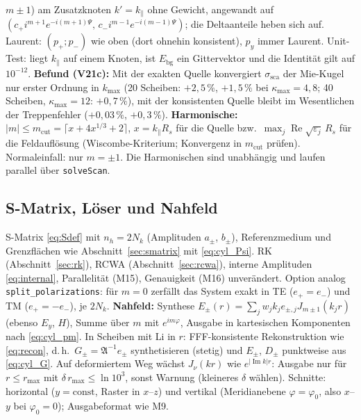 $m\pm1$) am Zusatzknoten $k'=k_\parallel$ ohne Gewicht, angewandt auf $(c_+i^{m+1}e^{-i(m+1)\Psi},\,c_-i^{m-1}e^{-i(m-1)\Psi})$;
die Deltaanteile heben sich auf. Laurent: $(p_+;p_-)$ wie oben (dort ohnehin konsistent), $p_y$ immer Laurent.
Unit-Test: liegt $k_\parallel$ auf einem Knoten, ist $E_{\text{bg}}$ ein Gittervektor und die Identität gilt auf $10^{-12}$.
\textbf{Befund (V21c):} Mit der exakten Quelle konvergiert $\sigma_{\text{sca}}$ der Mie-Kugel nur erster Ordnung in
$k_{\max}$ (20 Scheiben: $+2{,}5\,\%$, $+1{,}5\,\%$ bei $\kappa_{\max}=4,8$; 40 Scheiben, $\kappa_{\max}=12$: $+0{,}7\,\%$), mit der
konsistenten Quelle bleibt im Wesentlichen der Treppenfehler ($+0{,}03\,\%$, $+0{,}3\,\%$).
\textbf{Harmonische:} $|m|\le m_{\text{cut}}=\lceil x+4x^{1/3}+2\rceil$, $x=k_\parallel R_s$ für die Quelle bzw.\
$\max_j\operatorname{Re}\sqrt{\varepsilon_j}\,R_s$ für die Feldauflösung (Wiscombe-Kriterium; Konvergenz in $m_{\text{cut}}$
prüfen). Normaleinfall: nur $m=\pm1$. Die Harmonischen sind unabhängig und laufen parallel über \verb|solveScan|.

\subsection{S-Matrix, Löser und Nahfeld}
S-Matrix \eqref{eq:Sdef} mit $n_h=2N_k$ (Amplituden $a_\pm$, $b_\pm$), Referenzmedium und Grenzflächen wie
Abschnitt~\ref{sec:smatrix} mit \eqref{eq:cyl_Psi}. RK (Abschnitt~\ref{sec:rk}), RCWA (Abschnitt~\ref{sec:rcwa}),
interne Amplituden \eqref{eq:internal}, Parallelität (M15), Genauigkeit (M16) unverändert. Option analog
\verb|split_polarizations|: für $m=0$ zerfällt das System exakt in TE ($e_+=e_-$) und TM ($e_+=-e_-$), je $2N_k$.
\textbf{Nahfeld:} Synthese $E_\pm(r)=\sum_jw_jk_je_{\pm,j}J_{m\pm1}(k_jr)$ (ebenso $E_y$, $H$), Summe über $m$ mit
$e^{im\varphi}$, Ausgabe in kartesischen Komponenten nach \eqref{eq:cyl_pm}. In Scheiben mit Li in $r$: FFF-konsistente
Rekonstruktion wie \eqref{eq:recon}, d.\,h.\ $G_\pm=\mathfrak A^{-1}e_\pm$ synthetisieren (stetig) und $E_\pm$, $D_\pm$
punktweise aus \eqref{eq:cyl_G}. Auf deformiertem Weg wächst $J_\nu(kr)$ wie $e^{|\operatorname{Im}k|r}$: Ausgabe nur
für $r\le r_{\max}$ mit $\delta\,r_{\max}\le\ln10^{3}$, sonst Warnung (kleineres $\delta$ wählen). Schnitte:
horizontal ($y=\text{const}$, Raster in $x$--$z$) und vertikal (Meridianebene $\varphi=\varphi_0$, also $x$--$y$ bei
$\varphi_0=0$); Ausgabeformat wie M9.

